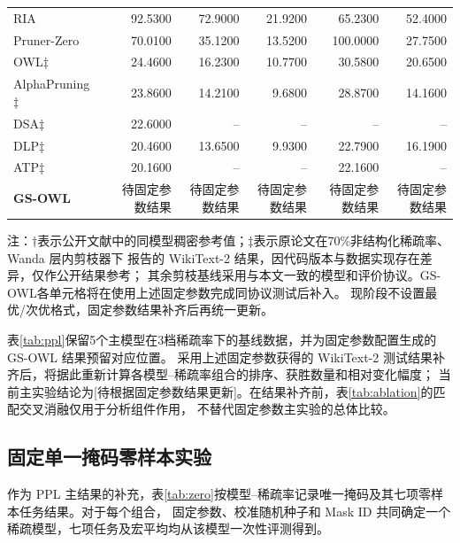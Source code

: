 \documentclass[UTF8,fontset=fandol]{ctexart}
\begin{document}
\begin{table}[!htbp]
\begin{tabular*}{0.98\textwidth}{@{\extracolsep{\fill}}lcrrrrr@{}}
  RIA & & 92.5300 & 72.9000 & 21.9200 & 65.2300 & 52.4000 \\
  Pruner-Zero & & 70.0100 & 35.1200 & 13.5200 & 100.0000 & 27.7500 \\
  OWL$\ddagger$ & & 24.4600 & 16.2300 & 10.7700 & 30.5800 & 20.6500 \\
  AlphaPruning$\ddagger$ & & 23.8600 & 14.2100 & 9.6800 & 28.8700 & 14.1600 \\
  DSA$\ddagger$ & & 22.6000 & -- & -- & -- & -- \\
  DLP$\ddagger$ & & 20.4600 & 13.6500 & 9.9300 & 22.7900 & 16.1900 \\
  ATP$\ddagger$ & & 20.1600 & -- & -- & 22.1600 & -- \\
  \textbf{GS-OWL} & & 待固定参数结果 & 待固定参数结果 & 待固定参数结果 & 待固定参数结果 & 待固定参数结果 \\
\bottomrule
\end{tabular*}
\vspace{2pt}
\parbox{0.98\textwidth}{\scriptsize
注：$\dagger$表示公开文献中的同模型稠密参考值；$\ddagger$表示原论文在70\%非结构化稀疏率、Wanda 层内剪枝器下
报告的 WikiText-2 结果\cite{owl,alphapruning,dsa,dlp,atp}，因代码版本与数据实现存在差异，仅作公开结果参考；
其余剪枝基线采用与本文一致的模型和评价协议。GS-OWL各单元格将在使用上述固定参数完成同协议测试后补入。
现阶段不设置最优/次优格式，固定参数结果补齐后再统一更新。}
\end{table}

表\ref{tab:ppl}保留5个主模型在3档稀疏率下的基线数据，并为固定参数配置生成的 GS-OWL 结果预留对应位置。
采用上述固定参数获得的 WikiText-2 测试结果补齐后，将据此重新计算各模型--稀疏率组合的排序、获胜数量和相对变化幅度；
当前主实验结论为[待根据固定参数结果更新]。在结果补齐前，表\ref{tab:ablation}的匹配交叉消融仅用于分析组件作用，
不替代固定参数主实验的总体比较。

\FloatBarrier
\subsection{固定单一掩码零样本实验}

作为 PPL 主结果的补充，表\ref{tab:zero}按模型--稀疏率记录唯一掩码及其七项零样本任务结果。对于每个组合，
固定参数、校准随机种子和 Mask ID 共同确定一个稀疏模型，七项任务及宏平均均从该模型一次性评测得到。
\end{document}

